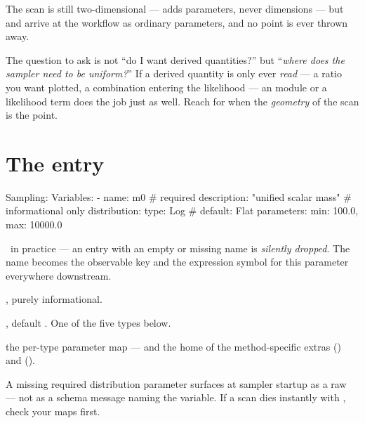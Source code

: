 The scan is still two-dimensional ---  adds parameters, never
dimensions --- but  and  arrive at the workflow as ordinary
parameters, and no point is ever thrown away.

\begin{jtip}
The question to ask is not ``do I want derived quantities?'' but ``\emph{where does the
sampler need to be uniform?}'' If a derived quantity is only ever \emph{read} --- a ratio
you want plotted, a combination entering the likelihood --- an  module or
a likelihood term does the job just as well. Reach for  when the
\emph{geometry} of the scan is the point.
\end{jtip}

\section{The  entry}
\label{sec:variables-entry}

\begin{yamlwin}
Sampling:
  Variables:
    - name: m0                     # required
      description: "unified scalar mass"   # informational only
      distribution:
        type: Log                  # default: Flat
        parameters: {min: 100.0, max: 10000.0}
\end{yamlwin}

\begin{keylist}
  \item[name] \req\ in practice --- an entry with an empty or missing name is
        \emph{silently dropped}. The name becomes the observable key and the expression
        symbol for this parameter everywhere downstream.
  \item[description] \opt, purely informational.
  \item[distribution.type] \opt, default . One of the five types below.
  \item[distribution.parameters] the per-type parameter map --- and the home of the
        method-specific extras  () and 
        ().
\end{keylist}

\begin{jwarn}
A missing required distribution parameter surfaces at sampler startup as a raw
 --- not as a schema message naming the variable. If a scan dies
instantly with , check your  maps first.
\end{jwarn}

